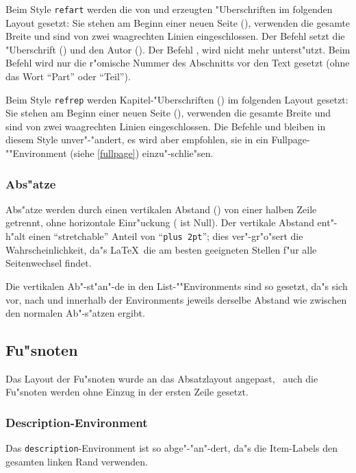 Beim Style \texttt{refart} werden die von  und 
erzeugten "Uberschriften im folgenden Layout gesetzt: Sie stehen am
Beginn einer neuen Seite (), verwenden die gesamte Breite
und sind von zwei waagrechten Linien eingeschlossen. Der Befehl
 setzt die "Uberschrift () und den Autor
(). Der Befehl , wird nicht mehr unterst"utzt.
Beim Befehl  wird nur die r"omische Nummer des Abschnitts vor
den Text gesetzt (ohne das Wort "`Part"' oder "`Teil"').

Beim Style \texttt{refrep} werden Kapitel-"Uberschriften ()
im folgenden Layout gesetzt: Sie stehen am Beginn einer neuen Seite
(), verwenden die gesamte Breite und sind von zwei
waagrechten Linien eingeschlossen. Die Befehle  und
 bleiben in diesem Style unver"-"andert, es wird aber
empfohlen, sie in ein Fullpage-""Environment (siehe \ref{fullpage})
einzu"-schlie"sen.

\subsubsection{Abs"atze}

Abs"atze  werden durch einen vertikalen Abstand () von einer
halben Zeile getrennt, ohne horizontale Einr"uckung ( ist
Null). Der vertikale Abstand ent"-h"alt einen "`stretchable"' Anteil von
"`\texttt{plus 2pt}"'; dies ver"-gr"o"sert die Wahrscheinlichkeit, da"s
\LaTeX\ die am besten geeigneten Stellen f"ur alle Seitenwechsel findet.

Die vertikalen Ab"-st"an"-de in den List-""Environments sind so gesetzt,
da"s sich vor, nach und innerhalb der Environments jeweils derselbe
Abstand wie zwischen den normalen Ab"-s"atzen ergibt.

\subsection{Fu"snoten}

Das Layout der Fu"snoten wurde an das Absatzlayout angepast, \dH\ auch
die Fu"snoten werden ohne Einzug in der ersten Zeile gesetzt.

\subsubsection{Description-Environment}

Das \texttt{description}-Environment ist so abge"-"an"-dert, da"s 
die Item-Labels den gesamten linken Rand verwenden.

